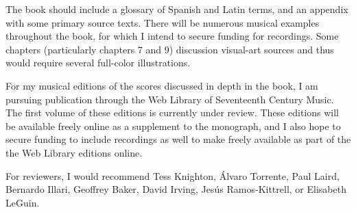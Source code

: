 \documentclass{vcbook-proposal}
\begin{document}
The book should include a glossary of Spanish and Latin terms, and an appendix with some primary source texts.
There will be numerous musical examples throughout the book, for which I intend to secure funding for recordings.
Some chapters (particularly chapters 7 and 9) discussion visual-art sources and thus would require several full-color illustrations.

For my musical editions of the scores discussed in depth in the book, I am pursuing publication through the Web Library of Seventeenth Century Music.
The first volume of these editions is currently under review.
These editions will be available freely online as a supplement to the monograph, and I also hope to secure funding to include recordings as well to make freely available as part of the the Web Library editions online.

For reviewers, I would recommend Tess Knighton, Álvaro Torrente, Paul Laird, Bernardo Illari, Geoffrey Baker, David Irving, Jesús Ramos-Kittrell, or Elisabeth LeGuin.
\end{document}
